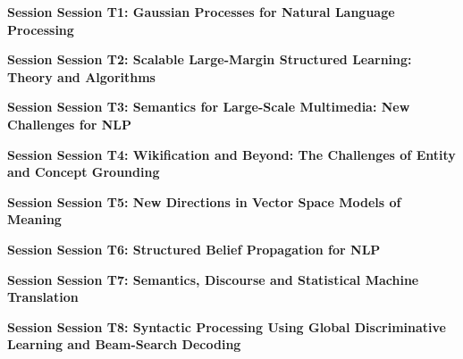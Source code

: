 \clearpage
\par\centerline{\bfseries\large Session Session T1: Gaussian Processes for Natural Language Processing}\vspace{1em}\par
\clearpage
\par\centerline{\bfseries\large Session Session T2: Scalable Large-Margin Structured Learning: Theory and Algorithms}\vspace{1em}\par
\clearpage
\par\centerline{\bfseries\large Session Session T3: Semantics for Large-Scale Multimedia: New Challenges for NLP}\vspace{1em}\par
\clearpage
\par\centerline{\bfseries\large Session Session T4: Wikification and Beyond: The Challenges of Entity and Concept Grounding}\vspace{1em}\par
\clearpage
\par\centerline{\bfseries\large Session Session T5: New Directions in Vector Space Models of Meaning}\vspace{1em}\par
\clearpage
\par\centerline{\bfseries\large Session Session T6: Structured Belief Propagation for NLP}\vspace{1em}\par
\clearpage
\par\centerline{\bfseries\large Session Session T7: Semantics, Discourse and Statistical Machine Translation}\vspace{1em}\par
\clearpage
\par\centerline{\bfseries\large Session Session T8: Syntactic Processing Using Global Discriminative Learning and Beam-Search Decoding}\vspace{1em}\par
